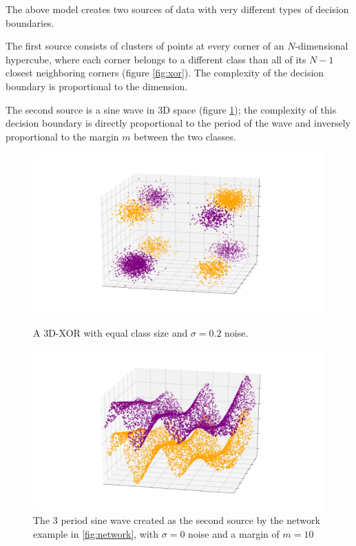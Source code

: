 \documentclass{article}
\begin{document}
The above model creates two sources of data with very different types of
decision boundaries.

The first source consists of clusters of points at every
corner of an $N$-dimensional hypercube, where each corner belongs to a
different class than all of its $N-1$ closest neighboring corners (figure
\ref{fig:xor}). The complexity of the decision boundary is proportional to the
dimension.

The second source is a sine wave in 3D space (figure \ref{fig:sine_wave}); the
complexity of this decision boundary is directly proportional to the period of
the wave and inversely proportional to the margin $m$ between the two classes.

\begin{figure}
\begin{minipage}{.5\textwidth}
    \centering
    \includegraphics[width=\textwidth]{xor_3d_square.png}
    \caption{A 3D-XOR with equal class size and $\sigma=0.2$ noise.}
    \label{fig:xor}
\end{minipage}
\begin{minipage}{.5\textwidth}
    \centering
    \includegraphics[width=\textwidth]{sine_wave_square.png}
    \caption{The 3 period sine wave created as the second source by the network
        example in \ref{fig:network}, with $\sigma=0$ noise and a margin of
        $m=10$}
    \label{fig:sine_wave}
\end{minipage}
\end{figure}
\end{document}
